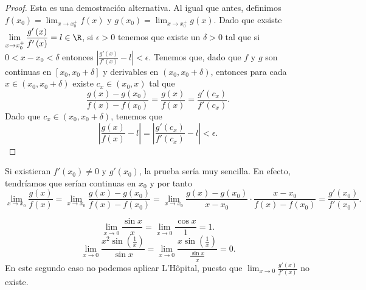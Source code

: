 \begin{proof}
	Esta es una demostración alternativa. Al igual que antes, definimos $\displaystyle f\left(x_{0}\right) = \lim_{x \to x_{0}^{+}}f\left(x\right) $ y $\displaystyle g\left(x_{0}\right) = \lim_{x \to x_{0}^{+}}g\left(x\right) $. Dado que exsiste $\displaystyle \lim_{x \to x_{0}^{+}} \frac{g'\left(x\right)}{f'\left(x\right)} = l \in \R$, si $\displaystyle \epsilon > 0 $ tenemos que existe un $\displaystyle \delta > 0 $ tal que si $\displaystyle 0 < x - x_{0} < \delta  $ entonces $\displaystyle \left|\frac{g'\left(x\right)}{f'\left(x\right)} - l\right| < \epsilon  $. Tenemos que, dado que $\displaystyle f $ y $\displaystyle g $ son continuas en $\displaystyle \left[x_{0}, x_{0}+\delta \right]  $ y derivables en $\displaystyle \left(x_{0}, x_{0}+\delta \right) $, entonces para cada $\displaystyle x \in (x_{0}, x_{0}+\delta) $  existe $\displaystyle c_{x} \in \left(x_{0}, x \right) $ tal que
	\[ \frac{g\left(x\right)-g\left(x_{0}\right)}{f\left(x\right)-f\left(x_{0}\right)} = \frac{g\left(x\right)}{f\left(x\right)} = \frac{g'\left(c_{x}\right)}{f'\left(c_{x}\right)} .\]
	Dado que $\displaystyle c_{x} \in \left(x_{0}, x_{0}+ \delta \right) $, tenemos que
	\[ \left|\frac{g\left(x\right)}{f\left(x\right)}-l\right| = \left|\frac{g'\left(c_{x}\right)}{f'\left(c_{x}\right)}-l\right|<\epsilon .\]
\end{proof}
\begin{observation}
\normalfont Si existieran $\displaystyle f'\left(x_{0}\right) \neq 0 $ y $\displaystyle g'\left(x_{0}\right) $, la prueba sería muy sencilla. En efecto, tendríamos que serían continuas en $\displaystyle x_{0} $ y por tanto
\[ \lim_{x \to x_{0}}\frac{g\left(x\right)}{f\left(x\right)} = \lim_{x \to x_{0}}\frac{g\left(x\right)-g\left(x_{0}\right)}{f\left(x\right)-f\left(x_{0}\right)} = \lim_{x \to x_{0}} \frac{g\left(x\right)-g\left(x_{0}\right)}{x - x_{0}} \cdot \frac{x - x_{0}}{f\left(x\right)-f\left(x_{0}\right)} = \frac{g'\left(x_{0}\right)}{f'\left(x_{0}\right)} .\]
\end{observation}
\begin{eg}
\normalfont 
\[\lim_{x \to 0}\frac{\sin x}{x} = \lim_{x \to 0} \frac{\cos x}{1} = 1 .\]
\[ \lim_{x \to 0}\frac{x^{2}\sin\left(\frac{1}{x}\right)}{\sin x} = \lim_{x \to 0}\frac{x \sin\left(\frac{1}{x}\right)}{\frac{\sin x}{x}} =  0 .\]
En este segundo caso no podemos aplicar L'Hôpital, puesto que $\displaystyle \lim_{x \to 0}\frac{g'\left(x\right)}{f'\left(x\right)} $ no existe.
\end{eg}
